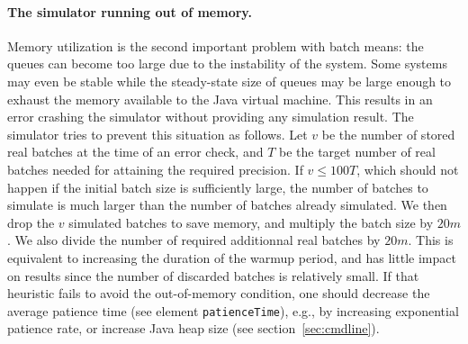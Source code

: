 \paragraph{The simulator running out of memory.}
Memory utilization is the second important problem with batch means:
the queues can become too large due to the instability of the system.
Some systems may even be stable while the steady-state
size of queues may be large enough to exhaust the memory available to
the Java virtual machine.  This
results in an error crashing the simulator without providing any
simulation result.
The simulator tries to prevent this situation as follows.
Let $v$ be the number of stored real batches at the time of an error
check, and $T$ be the target number of real batches needed for attaining
the required precision.
If $v\le 100T$, which should not happen if the
initial batch size is sufficiently large, the number of batches to
simulate is much larger than
the number of batches already simulated.
We then drop the $v$ simulated batches to save memory, and multiply the
batch size by $20m$.  We also divide the number of required
additionnal real batches by $20m$.
This is equivalent to increasing the duration of the warmup period,
and has little impact on results since the number of discarded batches
is relatively small.
If that heuristic fails to avoid the out-of-memory condition, one
should decrease the average patience time (see
element \texttt{patience\-Time}),
e.g.,
by increasing exponential patience rate, or increase Java heap size
(see section~\ref{sec:cmdline}).
